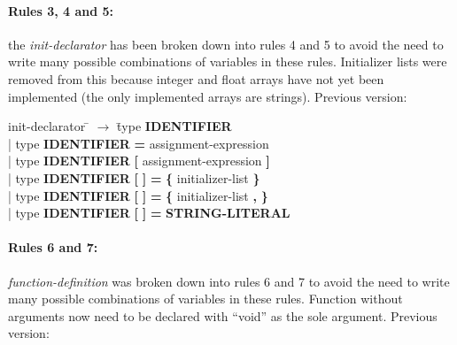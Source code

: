 \paragraph{Rules 3, 4 and 5:} the \textit{init-declarator} has been broken down into rules 4 and 5 to avoid
the need to write many possible combinations of variables in these rules. Initializer lists were removed
from this because integer and float arrays have not yet been implemented (the only implemented arrays are strings).
Previous version:

\begin{tabbing} init-declarator \= $\rightarrow$ \= type \textbf{IDENTIFIER}                                                                \\
	\> \hspace*{0.05cm} | \> type \textbf{IDENTIFIER} \textbf{=} assignment-expression                                                      \\
	\> \hspace*{0.05cm} | \> type \textbf{IDENTIFIER} \textbf{[} assignment-expression \textbf{]}                                           \\
	\> \hspace*{0.05cm} | \> type \textbf{IDENTIFIER} \textbf{[} \textbf{]} \textbf{=} \textbf{\{} initializer-list \textbf{\}}             \\
	\> \hspace*{0.05cm} | \> type \textbf{IDENTIFIER} \textbf{[} \textbf{]} \textbf{=} \textbf{\{} initializer-list \textbf{,} \textbf{\}}  \\
	\> \hspace*{0.05cm} | \> type \textbf{IDENTIFIER} \textbf{[} \textbf{]} \textbf{=} \textbf{STRING-LITERAL}                              \\
\end{tabbing}



\paragraph{Rules 6 and 7:} \textit{function-definition} was broken down into rules
6 and 7 to avoid the need to write many possible combinations of variables in these rules.
Function without arguments now need to be declared with ``void'' as the sole argument.
Previous version:

